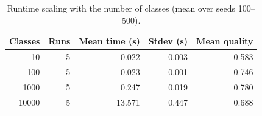 \begin{table}[t]
\centering
\caption{Runtime scaling with the number of classes (mean over seeds 100--500).}
\label{tab:time-scale}
\begin{tabular}{rrrrr}
\toprule
Classes & Runs & Mean time (s) & Stdev (s) & Mean quality \\
\midrule
10 & 5 & 0.022 & 0.003 & 0.583 \\
100 & 5 & 0.023 & 0.001 & 0.746 \\
1000 & 5 & 0.247 & 0.019 & 0.780 \\
10000 & 5 & 13.571 & 0.447 & 0.688 \\
\bottomrule
\end{tabular}
\end{table}
